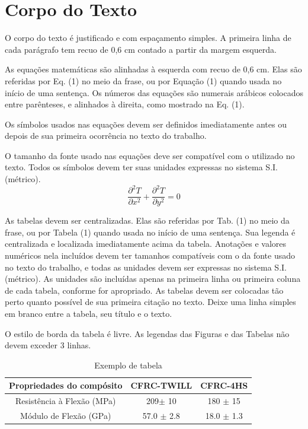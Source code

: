 \documentclass{ufscThesis}
\begin{document}
\section{Corpo do Texto}
O corpo do texto é justificado e com espaçamento simples. A primeira linha de cada parágrafo tem recuo de 0,6 cm contado a partir da margem esquerda.

As equações matemáticas são alinhadas à esquerda com recuo de 0,6 cm.  Elas são referidas por Eq. (1) no meio da frase, ou por Equação (1) quando usada no início de uma sentença. Os números das equações são numerais arábicos colocados entre parênteses, e alinhados à direita, como mostrado na Eq. (1).

Os símbolos usados nas equações devem ser definidos imediatamente antes ou depois de sua primeira ocorrência no texto do trabalho.

O tamanho da fonte usado nas equações deve ser compatível com o utilizado no texto. Todos os símbolos devem ter suas unidades expressas no sistema S.I. (métrico).
\begin{equation}
\frac{\partial ^2 T}{\partial x^2} + \frac{\partial ^2 T}{\partial y^2} =0
\end{equation}

As tabelas devem ser centralizadas. Elas são referidas por Tab. (1) no meio da frase, ou por Tabela (1) quando usada no início de uma sentença. Sua legenda é centralizada e localizada imediatamente acima da tabela. Anotações e valores numéricos nela incluídos devem ter tamanhos compatíveis com o da fonte usado no texto do trabalho, e todas as unidades devem ser expressas no sistema S.I. (métrico). As unidades são incluídas apenas na primeira linha ou primeira coluna de cada tabela, conforme for apropriado. As tabelas devem ser colocadas tão perto quanto possível de sua primeira citação no texto. Deixe uma linha simples em branco entre a tabela, seu título e o texto.

O estilo de borda da tabela é livre. As legendas das Figuras e das Tabelas não devem exceder 3 linhas.

\begin{table}[h]
\begin{center}
\caption{Exemplo de tabela}
\begin{tabular}{c|c|c}
\hline
Propriedades do compósito & CFRC-TWILL & CFRC-4HS\\
\hline
Resistência à Flexão (MPa) & 209$\pm$ 10 & 180 $\pm$  15\\
\hline
Módulo de Flexão  (GPa) & 57.0 $\pm$ 2.8 & 18.0 $\pm$  1.3\\
\hline
\end{tabular}
\end{center}
\end{table}
\end{document}

